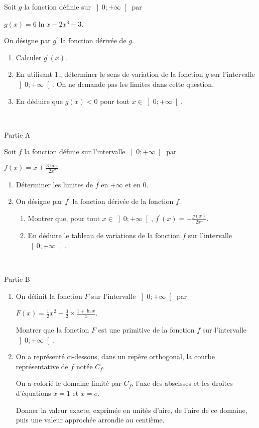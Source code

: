 Soit $g$ la fonction définie sur $\left]0; +\infty \right[$ par
\par
$g\left(x\right)=6\ln x-2x^{3}-3$.
\par
On désigne par $g^{\prime}$ la fonction dérivée de $g$.
\begin{enumerate}
     \item
     Calculer $g^{\prime}\left(x\right)$.
     \item
     En utilisant 1., déterminer le sens de variation de la fonction $g$ sur l'intervalle $\left]0; +\infty \right[$. On ne demande pas les limites dans cette question.
     \item
     En déduire que $g\left(x\right) < 0$ pour tout $x\in \left]0; +\infty \right[$.
\end{enumerate}
 
\begin{h3}Partie A\end{h3}
Soit $f$ la fonction définie sur l'intervalle $\left]0; +\infty \right[$ par
\par
$f\left(x\right)=x+\frac{3\ln x}{2x^{2}}$
\begin{enumerate}
     \item
     Déterminer les limites de $f$ en $+\infty $ et en $0$.
     \item
     On désigne par $f^{\prime}$ la fonction dérivée de la fonction $f$.
     \begin{enumerate}
          \item
          Montrer que, pour tout $x\in \left]0; +\infty \right[$, $f^{\prime}\left(x\right)=- \frac{g\left(x\right)}{2x^{3}}$.
          \item
          En déduire le tableau de variations de la fonction $f$ sur l'intervalle $\left]0; +\infty \right[$.
     \end{enumerate}
\end{enumerate}
 
\begin{h3}Partie B\end{h3}
\begin{enumerate}
     \item
     On définit la fonction $F$ sur I'intervalle $\left]0; +\infty \right[$ par
     \par
     $F\left(x\right)=\frac{1}{2}x^{2}-\frac{3}{2} \times   \frac{1+\ln x}{x}$.
     \par
     Montrer que la fonction $F$ est une primitive de la fonction $f$ sur l'intervalle $\left]0; +\infty \right[$.
     \item
     On a représenté ci-dessous, dans un repère orthogonal, la courbe représentative de $f$ notée $C_{f}$.
     \par
     On a colorié le domaine limité par $C_{f}$, l'axe des abscisses et les droites d'équations $x=1$ et $x= e$.
     \par
     Donner la valeur exacte, exprimée en unités d'aire, de l'aire de ce domaine, puis une valeur approchée arrondie au centième.

\begin{center}
\end{center}
\end{enumerate}

